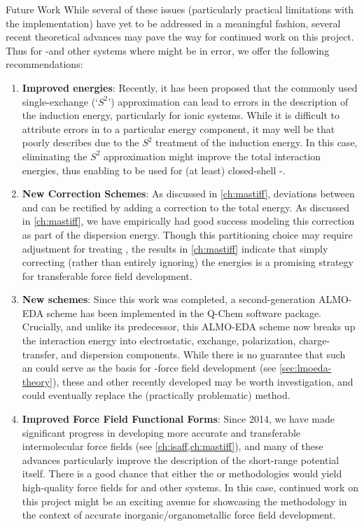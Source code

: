 \begin{section}{Future Work}
While several of these issues (particularly practical limitations with the
\lmoeda implementation) have yet to be addressed in a meaningful fashion,
several recent theoretical advances may pave the way for continued work on this
project. Thus for \cus-\mofs and other systems where \dftsapt might be in
error, we offer the following recommendations:
%
\begin{enumerate}
%
\item \textbf{Improved \sapt energies}: 
%
Recently, it has been proposed that the commonly used single-exchange (`$S^2$')
approximation can lead to errors in the description of the induction
energy, particularly for ionic systems.\cite{Jansen2012,Lao2015a} 
While it is difficult to attribute errors in \sapt to a particular energy
component, it may well be that \sapt poorly describes \mgmof due to the $S^2$
treatment of the induction energy. In this case, eliminating the $S^2$
approximation might improve the \dftsapt total interaction energies, thus
enabling \sapt to be used for (at least) closed-shell \cus-\mofs.
%
\item \textbf{New \sapt Correction Schemes}: 
%
As discussed in \cref{ch:mastiff}, deviations between \sapt and \ccsdt can be
rectified by adding a \dccsdt correction to the total \sapt energy.
As discussed in \cref{ch:mastiff}, we have empirically had good success modeling this \dccsdt correction as part of
the dispersion energy. Though this partitioning choice may require adjustment
for treating \mgmof, the results in
\cref{ch:mastiff}
indicate that simply correcting (rather than entirely ignoring) the \dftsapt energies
is a promising strategy for transferable force field development.
%
\item \textbf{New \eda schemes}: 
%
Since this work was completed, a second-generation ALMO-EDA scheme has been
implemented in the Q-Chem software package.\cite{Horn2016b} Crucially, and unlike its
predecessor, this ALMO-EDA scheme now breaks up the interaction energy into
electrostatic, exchange, polarization, charge-transfer, and dispersion
components. While there is no guarantee that such an \eda could serve as the
basis for \cus-\mof force field development (see \cref{sec:lmoeda-theory}),
these and other recently developed \edas may be worth investigation, and could
eventually replace the (practically problematic) \lmoeda method.
%
\item \textbf{Improved Force Field Functional Forms}: 
%
Since 2014, we have made significant progress in developing more accurate and
transferable intermolecular force fields (see \cref{ch:isaff,ch:mastiff}), and
many of these advances particularly improve the description of the short-range
potential itself. There is a good chance that either the \isaffold or \mastiff
methodologies would yield high-quality force fields for \mgmof and other
systems. In this case, continued work on this project might be an exciting
avenue for showcasing the \mastiff methodology in the context of
accurate inorganic/organometallic force field development.
%
\end{enumerate}



\end{section}
